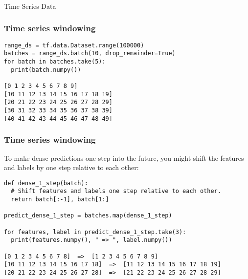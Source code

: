 \begin{frame}
  \begin{center}
    {\Large Time Series Data}
	
  \end{center}
\end{frame}

\begin{frame}[fragile]\frametitle{Time series windowing}
\begin{lstlisting}
range_ds = tf.data.Dataset.range(100000)
batches = range_ds.batch(10, drop_remainder=True)
for batch in batches.take(5):
  print(batch.numpy())
	
[0 1 2 3 4 5 6 7 8 9]
[10 11 12 13 14 15 16 17 18 19]
[20 21 22 23 24 25 26 27 28 29]
[30 31 32 33 34 35 36 37 38 39]
[40 41 42 43 44 45 46 47 48 49]
\end{lstlisting}
\end{frame}

\begin{frame}[fragile]\frametitle{Time series windowing}

To make dense predictions one step into the future, you might shift the features and labels by one step relative to each other:

\begin{lstlisting}
def dense_1_step(batch):
  # Shift features and labels one step relative to each other.
  return batch[:-1], batch[1:]

predict_dense_1_step = batches.map(dense_1_step)

for features, label in predict_dense_1_step.take(3):
  print(features.numpy(), " => ", label.numpy())
	
[0 1 2 3 4 5 6 7 8]  =>  [1 2 3 4 5 6 7 8 9]
[10 11 12 13 14 15 16 17 18]  =>  [11 12 13 14 15 16 17 18 19]
[20 21 22 23 24 25 26 27 28]  =>  [21 22 23 24 25 26 27 28 29]
\end{lstlisting}
\end{frame}

